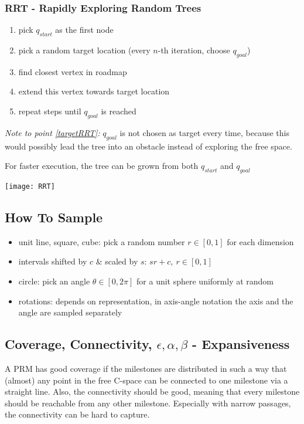 \begin{multicols*}{2}
\subsubsection{RRT - Rapidly Exploring Random Trees}
\begin{enumerate}
	\item pick $q_{start}$ as the first node
	\item pick a random target location (every $n$-th
iteration, choose $q_{goal}$) \label{targetRRT}
	\item find closest vertex in roadmap
	\item extend this vertex towards target location
	\item repeat steps until $q_{goal}$ is reached
\end{enumerate}
\textit{Note to point \ref{targetRRT}:} $q_{goal}$ is not chosen as target every time, because this would possibly lead the tree into an obstacle instead of exploring the free space.

For faster execution, the tree can be grown from both $q_{start}$ and $q_{goal}$

\texttt{[image: RRT]}


\subsection{How To Sample}
\begin{itemize}
	\item unit line, square, cube: pick a random number $r\in [0,1]$ for each dimension
	\item intervals shifted by $c$ \& scaled by $s$: $sr+c, ~ r\in [0,1]$ 
	\item circle: pick an angle $\theta \in [0, 2\pi]$ for a unit sphere uniformly at random
	\item rotations: depends on representation, in axis-angle notation the axis and the angle are sampled separately
\end{itemize}

\subsection{Coverage, Connectivity, $\epsilon, \alpha, \beta$ - Expansiveness}
A PRM has good coverage if the milestones are distributed in such a way that (almost) any point in the free C-space can be connected to one milestone via a straight line. Also, the connectivity should be good, meaning that every milestone should be reachable from any other milestone. Especially with narrow passages, the connectivity can be hard to capture.


\end{multicols*}
